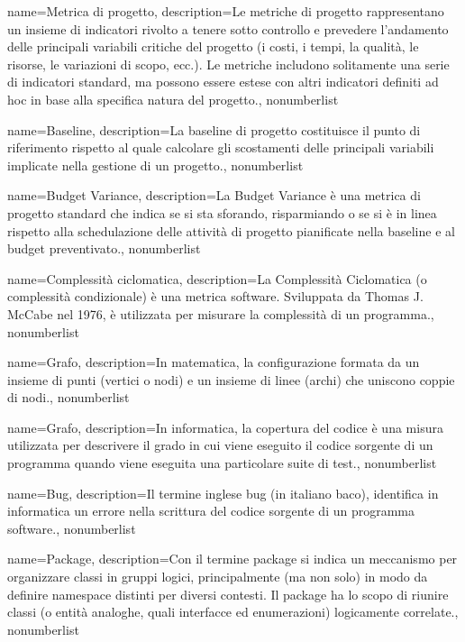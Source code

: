 {
	name={Metrica di progetto},
	description={Le metriche di progetto rappresentano un insieme di indicatori rivolto a tenere sotto controllo e prevedere l'andamento delle principali variabili critiche del progetto (i costi, i tempi, la qualità, le risorse, le variazioni di scopo, ecc.). Le metriche includono solitamente una serie di indicatori standard, ma possono essere estese con altri indicatori definiti ad hoc in base alla specifica natura del progetto.}, 
	nonumberlist 
}

{
	name={Baseline},
	description={La baseline di progetto costituisce il punto di riferimento rispetto al quale calcolare gli scostamenti delle principali variabili implicate nella gestione di un progetto.}, 
	nonumberlist 
}

{
	name={Budget Variance},
	description={La Budget Variance è una metrica di progetto standard che indica se si sta sforando, risparmiando o se si è in linea rispetto alla schedulazione delle attività di progetto pianificate nella baseline e al budget preventivato.}, 
	nonumberlist 
}

{
	name={Complessità ciclomatica},
	description={La Complessità Ciclomatica (o complessità condizionale) è una metrica software. Sviluppata da Thomas J. McCabe nel 1976, è utilizzata per misurare la complessità di un programma.}, 
	nonumberlist 
}

{
	name={Grafo},
	description={In matematica, la configurazione formata da un insieme di punti (vertici o nodi) e un insieme di linee (archi) che uniscono coppie di nodi.}, 
	nonumberlist 
}

{
	name={Grafo},
	description={In informatica, la copertura del codice è una misura utilizzata per descrivere il grado in cui viene eseguito il codice sorgente di un programma quando viene eseguita una particolare suite di test.}, 
	nonumberlist 
}

{
	name={Bug},
	description={Il termine inglese bug (in italiano baco), identifica in informatica un errore nella scrittura del codice sorgente di un programma software.}, 
	nonumberlist 
}

{
	name={Package},
	description={Con il termine package si indica un meccanismo per organizzare classi in gruppi logici, principalmente (ma non solo) in modo da definire namespace distinti per diversi contesti. Il package ha lo scopo di riunire classi (o entità analoghe, quali interfacce ed enumerazioni) logicamente correlate.}, 
	nonumberlist 
}


